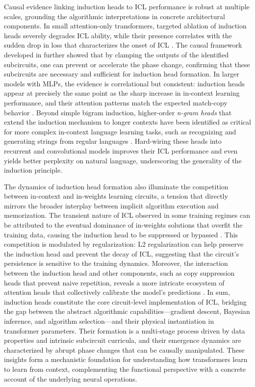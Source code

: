 \documentclass[11pt]{article}
\begin{document}
Causal evidence linking induction heads to ICL performance is robust at multiple scales, grounding the algorithmic interpretations in concrete architectural components. In small attention-only transformers, targeted ablation of induction heads severely degrades ICL ability, while their presence correlates with the sudden drop in loss that characterizes the onset of ICL \cite{ref49}. The causal framework developed in \cite{ref51} further showed that by clamping the outputs of the identified subcircuits, one can prevent or accelerate the phase change, confirming that these subcircuits are necessary and sufficient for induction head formation. In larger models with MLPs, the evidence is correlational but consistent: induction heads appear at precisely the same point as the sharp increase in in-context learning performance, and their attention patterns match the expected match-copy behavior \cite{ref49}. Beyond simple bigram induction, higher-order \emph{n-gram heads} that extend the induction mechanism to longer contexts have been identified as critical for more complex in-context language learning tasks, such as recognizing and generating strings from regular languages \cite{ref52}. Hard-wiring these heads into recurrent and convolutional models improves their ICL performance and even yields better perplexity on natural language, underscoring the generality of the induction principle.

The dynamics of induction head formation also illuminate the competition between in-context and in-weights learning circuits, a tension that directly mirrors the broader interplay between implicit algorithm execution and memorization. The transient nature of ICL observed in some training regimes can be attributed to the eventual dominance of in-weights solutions that overfit the training data, causing the induction head to be suppressed or bypassed \cite{ref53}. This competition is modulated by regularization: L2 regularization can help preserve the induction head and prevent the decay of ICL, suggesting that the circuit's persistence is sensitive to the training dynamics. Moreover, the interaction between the induction head and other components, such as copy suppression heads that prevent naive repetition, reveals a more intricate ecosystem of attention heads that collectively calibrate the model's predictions \cite{ref54}. In sum, induction heads constitute the core circuit-level implementation of ICL, bridging the gap between the abstract algorithmic capabilities---gradient descent, Bayesian inference, and algorithm selection---and their physical instantiation in transformer parameters. Their formation is a multi-stage process driven by data properties and intrinsic subcircuit curricula, and their emergence dynamics are characterized by abrupt phase changes that can be causally manipulated. These insights form a mechanistic foundation for understanding how transformers learn to learn from context, complementing the functional perspective with a concrete account of the underlying neural operations.
\end{document}
